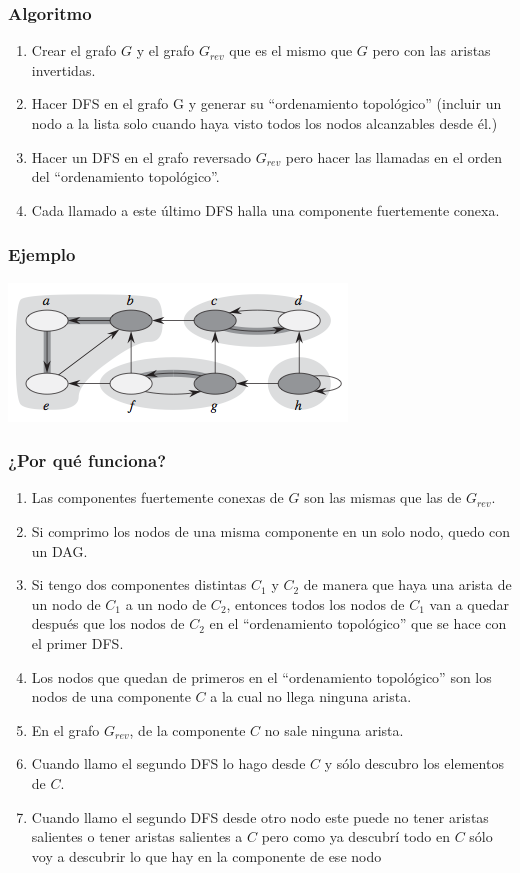 \documentclass{beamer}
\begin{document}
	\begin{frame}
		\frametitle{Algoritmo}
		\begin{enumerate}
			\item Crear el grafo $G$ y el grafo $G_{rev}$ que es el mismo que $G$ pero con las aristas invertidas.
			\item Hacer DFS en el grafo G y generar su ``ordenamiento topológico'' (incluir un nodo a la lista solo cuando haya visto todos los nodos alcanzables desde él.)
			\item Hacer un DFS en el grafo reversado $G_{rev}$ pero hacer las llamadas en el orden del ``ordenamiento topológico''.
			\item Cada llamado a este último DFS halla una componente fuertemente conexa.
		\end{enumerate}
	\end{frame}
	
	\begin{frame}
		\frametitle{Ejemplo}
		\begin{center} \includegraphics[height = 0.5\textheight]{scc.png} \end{center}
	\end{frame}
	
	\begin{frame}[allowframebreaks]
		\frametitle{¿Por qué funciona?}
		\begin{enumerate}
			\item Las componentes fuertemente conexas de $G$ son las mismas que las de $G_{rev}$.
			\item Si comprimo los nodos de una misma componente en un solo nodo, quedo con un DAG.
			\item Si tengo dos componentes distintas $C_1$ y $C_2$ de manera que haya una arista de un nodo de $C_1$ a un nodo de $C_2$, entonces todos los nodos de $C_1$ van a quedar después que los nodos de $C_2$ en el ``ordenamiento topológico'' que se hace con el primer DFS.
			\framebreak
			\item Los nodos que quedan de primeros en el ``ordenamiento topológico'' son los nodos de una componente $C$ a la cual no llega ninguna arista.
			\item En el grafo $G_{rev}$, de la componente $C$ no sale ninguna arista.
			\item Cuando llamo el segundo DFS lo hago desde $C$ y sólo descubro los elementos de $C$.
			\item Cuando llamo el segundo DFS desde otro nodo este puede no tener aristas salientes o tener aristas salientes a $C$ pero como ya descubrí todo en $C$ sólo voy a descubrir lo que hay en la componente de ese nodo
		\end{enumerate}
	\end{frame}
\end{document}
